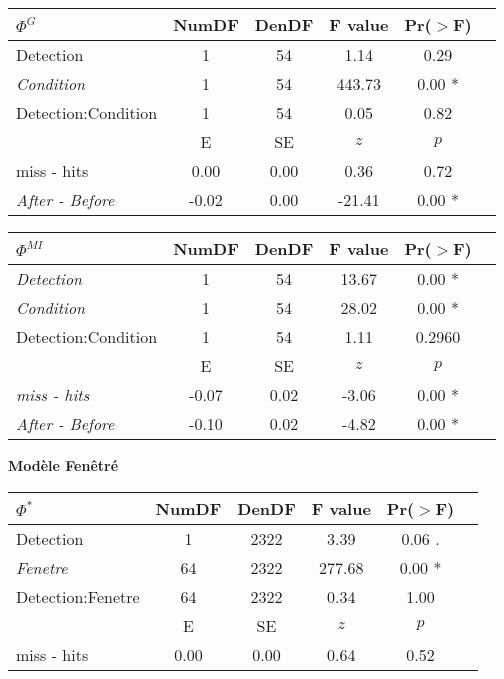 \begin{table}
\begin{multicols}{2}
\begin{tabular}{|l|*{5}{c|}}
\hline
\textbf{$\Phi^{G}$} & \textbf{NumDF} & \textbf{DenDF} & \textbf{F value} & \textbf{Pr($>$F)} \\ 
\hline
Detection & 1 & 54 & 1.14 & 0.29 \\ 
\textit{Condition} & 1 & 54 & 443.73 & 0.00 * \\ 
Detection:Condition & 1 & 54 & 0.05 & 0.82 \\ 
\hline
& E & SE & $z$ & $p$ \\
\hline
miss - hits & 0.00 & 0.00 & 0.36 & 0.72 \\ 
\hline
\textit{After - Before} & -0.02 & 0.00 & -21.41 & 0.00 * \\ 
\hline
\end{tabular}

\vspace{0.5cm}

\begin{tabular}{|l|*{5}{c|}}
\hline
\textbf{$\Phi^{MI}$} & \textbf{NumDF} & \textbf{DenDF} & \textbf{F value} & \textbf{Pr($>$F)} \\ 
\hline
\textit{Detection} & 1 & 54 & 13.67 & 0.00 * \\ 
\textit{Condition} & 1 & 54 & 28.02 & 0.00 * \\ 
Detection:Condition & 1 & 54 & 1.11 & 0.2960 \\ 
\hline
& E & SE & $z$ & $p$ \\
\hline
\textit{miss - hits} & -0.07 & 0.02 & -3.06 & 0.00 * \\ 
\hline
\textit{After - Before} & -0.10 & 0.02 & -4.82 & 0.00 * \\ 
\hline
\end{tabular}

\end{multicols}

\vspace{1cm}

\textbf{Modèle Fenêtré}

\begin{multicols}{2}

\begin{tabular}{|l|*{5}{c|}}
\hline
\textbf{$\Phi^{*}$} & \textbf{NumDF} & \textbf{DenDF} & \textbf{F value} & \textbf{Pr($>$F)} \\ 
\hline
Detection & 1 & 2322 & 3.39 & 0.06 . \\ 
\textit{Fenetre} & 64 & 2322 & 277.68 & 0.00 * \\ 
Detection:Fenetre & 64 & 2322 & 0.34 & 1.00 \\ 
\hline
& E & SE & $z$ & $p$ \\
\hline
miss - hits & 0.00 & 0.00 & 0.64 & 0.52 \\ 
\hline
\end{tabular}


\end{multicols}
\end{table}

